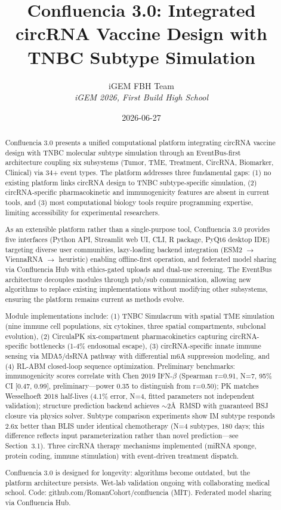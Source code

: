\documentclass[12pt]{article}
\title{Confluencia 3.0: Integrated circRNA Vaccine Design with TNBC Subtype Simulation}
\author{
iGEM FBH Team\\
\textit{iGEM 2026, First Build High School}
}
\date{2026-06-27}
\begin{document}
\maketitle

\begin{abstract}
Confluencia 3.0 presents a unified computational platform integrating circRNA vaccine design with TNBC molecular subtype simulation through an EventBus-first architecture coupling six subsystems (Tumor, TME, Treatment, CircRNA, Biomarker, Clinical) via 34+ event types. The platform addresses three fundamental gaps: (1) no existing platform links circRNA design to TNBC subtype-specific simulation, (2) circRNA-specific pharmacokinetic and immunogenicity features are absent in current tools, and (3) most computational biology tools require programming expertise, limiting accessibility for experimental researchers.

As an extensible platform rather than a single-purpose tool, Confluencia 3.0 provides five interfaces (Python API, Streamlit web UI, CLI, R package, PyQt6 desktop IDE) targeting diverse user communities, lazy-loading backend integration (ESM2 $\rightarrow$ ViennaRNA $\rightarrow$ heuristic) enabling offline-first operation, and federated model sharing via Confluencia Hub with ethics-gated uploads and dual-use screening. The EventBus architecture decouples modules through pub/sub communication, allowing new algorithms to replace existing implementations without modifying other subsystems, ensuring the platform remains current as methods evolve.

Module implementations include: (1) TNBC Simulacrum with spatial TME simulation (nine immune cell populations, six cytokines, three spatial compartments, subclonal evolution), (2) CirculaPK six-compartment pharmacokinetics capturing circRNA-specific bottlenecks (1-4\% endosomal escape), (3) circRNA-specific innate immune sensing via MDA5/dsRNA pathway with differential m6A suppression modeling, and (4) RL-ABM closed-loop sequence optimization. Preliminary benchmarks: immunogenicity scores correlate with Chen 2019 IFN-$\beta$ (Spearman r=0.91, N=7, 95\% CI [0.47, 0.99], preliminary—power 0.35 to distinguish from r=0.50); PK matches Wesselhoeft 2018 half-lives (4.1\% error, N=4, fitted parameters not independent validation); structure prediction backend achieves $\sim$2\AA\ RMSD with guaranteed BSJ closure via physics solver. Subtype comparison experiments show IM subtype responds 2.6x better than BLIS under identical chemotherapy (N=4 subtypes, 180 days; this difference reflects input parameterization rather than novel prediction—see Section~3.1). Three circRNA therapy mechanisms implemented (miRNA sponge, protein coding, immune stimulation) with event-driven treatment dispatch.

Confluencia 3.0 is designed for longevity: algorithms become outdated, but the platform architecture persists. Wet-lab validation ongoing with collaborating medical school. Code: github.com/RomanCohort/confluencia (MIT). Federated model sharing via Confluencia Hub.
\end{abstract}
\end{document}
